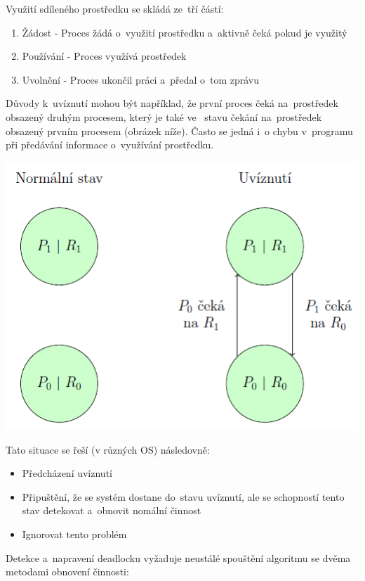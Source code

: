 Využití sdíleného prostředku se skládá ze~tří částí:
\begin{enumerate}
    \item Žádost - Proces žádá o~využití prostředku a~aktivně čeká pokud je využitý
    \item Používání - Proces využívá prostředek
    \item Uvolnění - Proces ukončil práci a~předal o~tom zprávu
\end{enumerate}

Důvody k~uvíznutí mohou být například, že první proces čeká na~prostředek obsazený druhým procesem, který je také ve~ stavu čekání na~prostředek obsazený prvním procesem (obrázek níže). Často se jedná i~o chybu v~programu při předávání informace o~využívání prostředku.

\begin{center}
    \includegraphics[scale=1]{images/proc_deadlock.png}
\end{center}

Tato situace se řeší (v různých OS) následovně:
\begin{itemize}
    \item Předcházení uvíznutí
    \item Připuštění, že se systém dostane do~stavu uvíznutí, ale se schopností tento stav detekovat a~obnovit nomální činnost
    \item Ignorovat tento problém
\end{itemize}

Detekce a~napravení deadlocku vyžaduje neustálé spouštění algoritmu se dvěma metodami obnovení činnosti:

